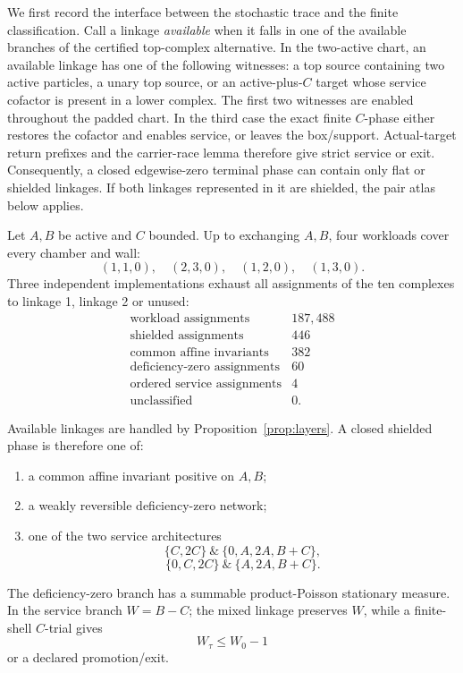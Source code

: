 \documentclass[11pt]{article}
\begin{document}
We first record the interface between the stochastic trace and the finite
classification.  Call a linkage \emph{available} when it falls in one of the
available branches of the certified top-complex alternative.  In the
two-active chart, an available linkage has one of the following witnesses:
a top source containing two active particles, a unary top source, or an
active-plus-\(C\) target whose service cofactor is present in a lower complex.
The first two witnesses are enabled throughout the padded chart.  In the
third case the exact finite \(C\)-phase either restores the cofactor and
enables service, or leaves the box/support.  Actual-target return prefixes and
the carrier-race lemma therefore give strict service or exit.  Consequently,
a closed edgewise-zero terminal phase can contain only flat or shielded
linkages.  If both linkages represented in it are shielded, the pair atlas
below applies.

Let \(A,B\) be active and \(C\) bounded.  Up to exchanging \(A,B\), four
workloads cover every chamber and wall:
\[
 (1,1,0),\quad(2,3,0),\quad(1,2,0),\quad(1,3,0).
\]
Three independent implementations exhaust all assignments of the ten
complexes to linkage 1, linkage 2 or unused:
\[
\begin{array}{lr}
\text{workload assignments}&187{,}488\\
\text{shielded assignments}&446\\
\text{common affine invariants}&382\\
\text{deficiency-zero assignments}&60\\
\text{ordered service assignments}&4\\
\text{unclassified}&0.
\end{array}
\]

Available linkages are handled by Proposition~\ref{prop:layers}.  A closed
shielded phase is therefore one of:
\begin{enumerate}[label=(\roman*)]
\item a common affine invariant positive on \(A,B\);
\item a weakly reversible deficiency-zero network;
\item one of the two service architectures
\[
 \{C,2C\}\ \&\ \{0,A,2A,B+C\},
\]
\[
 \{0,C,2C\}\ \&\ \{A,2A,B+C\}.
\]
\end{enumerate}
The deficiency-zero branch has a summable product-Poisson stationary measure.
In the service branch \(W=B-C\); the mixed linkage preserves \(W\), while a
finite-shell \(C\)-trial gives
\[
 W_\tau\le W_0-1
\]
or a declared promotion/exit.
\end{document}
